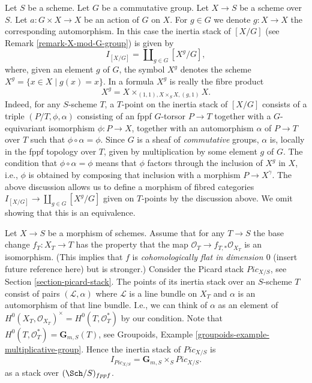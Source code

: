 \begin{example}
\label{example-inertia-stack-of-X-mod-G}
Let $S$ be a scheme. Let $G$ be a commutative group.
Let $X \to S$ be a scheme over $S$.
Let $a : G \times X \to X$ be an action of $G$ on $X$.
For $g \in G$ we denote $g : X \to X$ the corresponding automorphism.
In this case the inertia stack of $[X/G]$ (see
Remark \ref{remark-X-mod-G-group})
is given by
$$
I_{[X/G]} = \coprod\nolimits_{g\in G} [X^g/G],
$$
where, given an element $g$ of $G$, the symbol $X^g$ denotes the
scheme $X^g = \{x \in X \mid g(x) = x\}$. In a formula
$X^g$ is really the fibre
product
$$
X^g =  X \times_{(1, 1), X \times_S X, (g, 1)} X.
$$
Indeed, for any $S$-scheme $T$, a
$T$-point on the inertia stack of $[X/G]$ consists of a
triple $(P/T, \phi, \alpha)$ consisting of an fppf $G$-torsor
$P\to T$ together with a $G$-equivariant isomorphism
$\phi : P \to X$, together
with an automorphism $\alpha$ of $P\to T$ over $T$ such that
$\phi \circ \alpha = \phi$.
Since $G$ is a sheaf of \emph{commutative} groups,
$\alpha$ is, locally in the fppf topology over $T$,
given by multiplication by some element $g$ of $G$.
The condition that $\phi \circ \alpha = \phi$ means that $\phi$
factors through the inclusion of $X^g$
in $X$, i.e., $\phi$ is obtained by composing that inclusion with a
morphism $P \to X^\gamma$.
The above discussion allows us to define a morphism of fibred categories
$I_{[X/G]} \to \coprod_{g\in G} [X^g/G]$ given on $T$-points by the discussion
above. We omit showing that this is an equivalence.
\end{example}

\begin{example}
\label{example-inertia-stack-of-picard}
Let $X\to S$ be a morphism of schemes.
Assume that for any $T \to S$ the base change $f_T : X_T \to T$
has the property that the map $\mathcal{O}_T \to f_{T, *}\mathcal{O}_{X_T}$
is an isomorphism. (This implies that $f$ is
{\it cohomologically flat in dimension $0$} (insert future reference here)
but is stronger.) Consider the Picard stack $\textit{Pic}_{X/S}$, see
Section \ref{section-picard-stack}.
The points of its inertia stack over an
$S$-scheme $T$ consist of pairs $(\mathcal{L}, \alpha)$
where $\mathcal{L}$ is a line bundle
on $X_T$ and $\alpha$ is an automorphism of that line bundle.
I.e., we can think of $\alpha$ as an element of
$H^0(X_T, \mathcal{O}_{X_T})^\times = H^0(T, \mathcal{O}_T^*)$
by our condition. Note that $H^0(T, \mathcal{O}_T^*) = \mathbf{G}_{m, S}(T)$,
see Groupoids, Example \ref{groupoids-example-multiplicative-group}.
Hence the inertia stack of $\textit{Pic}_{X/S}$ is
$$
I_{\textit{Pic}_{X/S}} = \mathbf{G}_{m, S} \times_S \textit{Pic}_{X/S}.
$$
as a stack over $(\Sch/S)_{fppf}$.
\end{example}






